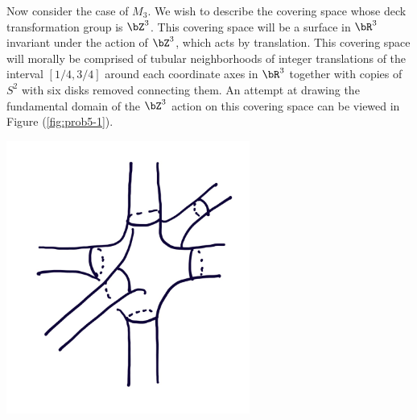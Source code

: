 \begin{homework}[e]
\begin{prf}
    Now consider the case of $M_3$. We wish to describe the covering space whose deck transformation group is $\bZ^3$. This covering space will be a surface in $\bR^3$ invariant under the action of $\bZ^3$, which acts by translation. This covering space will morally be comprised of tubular neighborhoods of integer translations of the interval $[1/4,3/4]$ around each coordinate axes in $\bR^3$ together with copies of $S^2$ with six disks removed connecting them. An attempt at drawing the fundamental domain of the $\bZ^3$ action on this covering space can be viewed in Figure (\ref{fig:prob5-1}).
    \begin{center}
      \includegraphics[width=8cm]{figures/hwk6-fig6.png}
      \label{fig:prob5-1}
    \end{center}


\end{prf}
\end{homework}
